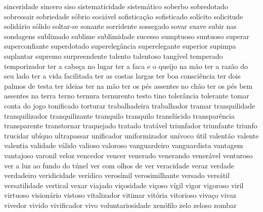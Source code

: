 \documentclass[ruledheader]{abnt_UFF}
\begin{document}
sinceridade sincero siso sistematicidade sistem\'{a}tico soberbo sobredotado sobressair sobriedade s\'{o}brio soci\'{a}vel sofistica\c{c}\~ao sofisticado sol\'{i}cito solicitude solid\'{a}rio s\'{o}lido soltar-se sonante sorridente sossegado sovar suave subir nas sondagens sublimado sublime sublimidade sucesso sumptuoso suntuoso superar superconfiante superdotado supereleg\^{a}ncia superelegante superior supimpa suplantar supremo surpreendente talento talentoso tang\'{i}vel temperado temporizador ter a cabe\c{c}a no lugar ter a faca e o queijo na m\~ao ter a raz\~ao do seu lado ter a vida facilitada ter as costas largas ter boa consci\^{e}ncia ter dois palmos de testa ter ideias ter na m\~ao ter os p\'{e}s assentes no ch\~ao ter os p\'{e}s bem assentes na terra terno ternura ternurento testo tino toler\^{a}ncia tolerante tomar conta do jogo tonificado torturar trabalhadeira trabalhador tramar tranquilidade tranquilizador tranquilizante tranquilo tranquilo transl\'{u}cido transpar\^{e}ncia transparente transtornar traquejado tratado trat\'{a}vel triunfador triunfante triunfo trucidar ub\'{i}quo ultrapassar unificador uniformizador un\'{i}voco \'{u}til valent\~ao valente valentia validade v\'{a}lido valioso valoroso vanguardeiro vanguardista vantagem vantajoso varonil veloz vencedor vencer venerado venerando vener\'{a}vel venturoso ver a luz ao fundo do t\'{u}nel ver com olhos de ver veracidade veraz verdade verdadeiro veridicidade ver\'{i}dico veros\'{i}mil verosimilhante versado vers\'{a}til versatilidade vertical vexar viajado vi\c{c}osidade vi\c{c}oso v\'{i}gil vigor vigoroso viril virtuoso vision\'{a}rio vistoso vitalizador vitimar vit\'{o}ria vitorioso viva\c{c}o vivaz vivedor vivido vivificador vivo voluntariosidade xen\'{o}filo zelo zeloso zombar 
\label{LastPage}
\end{document}
